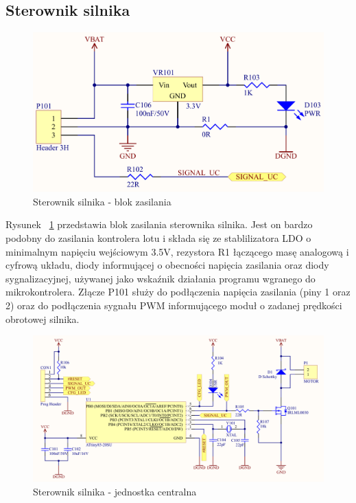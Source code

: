\subsection{Sterownik silnika}

\begin{figure}[H]
	\centering
	\includegraphics[scale=0.45]{Pictures/MotorController_PWR_C.png}
		\caption[Sterownik silnika - blok zasilania]{Sterownik silnika - blok zasilania}
	\label{fig:MotorDriver_PWR}
\end{figure}

Rysunek ~\ref{fig:MotorDriver_PWR} przedstawia blok zasilania sterownika silnika. Jest on bardzo podobny do zasilania kontrolera lotu i składa się ze stablilizatora LDO o minimalnym napięciu wejściowym 3.5V, rezystora R1 łączącego masę analogową i cyfrową układu, diody informującej o obecności napięcia zasilania oraz diody sygnalizacyjnej, używanej jako wskaźnik działania programu wgranego do mikrokontrolera. Złącze P101 służy do podłączenia napięcia zasilania (piny 1 oraz 2) oraz do podłączenia sygnału PWM informującego moduł o zadanej prędkości obrotowej silnika.

\begin{figure}[H]
	\centering
	\includegraphics[scale=0.30, angle=90]{Pictures/MotorController_Main_C.png}
		\caption[Sterownik silnika - jednostka centralna]{Sterownik silnika - jednostka centralna}
	\label{fig:MotorDriver_MAIN}
\end{figure}

